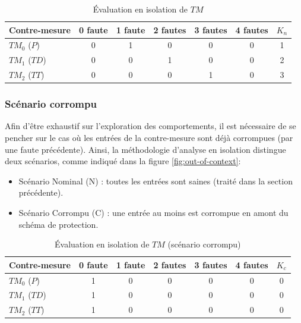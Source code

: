                 \begin{table}[ht]
                    {\small
                    \begin{center}
                        \begin{tabular}{l|cccccc}
                        Contre-mesure & 0 faute & 1 faute & 2 fautes & 3 fautes & 4 fautes & $K_n$ \\
                        \hline
                        $TM_0$ ($P$) & 0 & 1 & 0 & 0 & 0 & 1\\
                        $TM_1$ ($TD$) & 0 & 0 & 1 & 0 & 0 & 2 \\
                        $TM_2$ ($TT$) & 0 & 0 & 0 & 1 & 0 & 3
                        \end{tabular}
                    \end{center} 
                    }
                    \caption{Évaluation en isolation de $TM$ \label{tbl:tm-ooc-N}}
                \end{table}
            
            \subsubsection{Scénario corrompu}
            \label{sec:fscenario}
            
                Afin d'être exhaustif sur l'exploration des comportements, il est nécessaire de se pencher sur le cas où les entrées de la contre-mesure sont déjà corrompues (par une faute précédente).
                Ainsi, la méthodologie d'analyse en isolation distingue deux scénarios, comme indiqué dans la figure \ref{fig:out-of-context}:
                \begin{itemize}
                    \item Scénario Nominal (N) : toutes les entrées sont saines (traité dans la section précédente).
                    \item Scénario Corrompu (C) : une entrée au moins est corrompue en amont du schéma de protection.
                \end{itemize}
                
                \begin{table}[ht]
                    {\small
                    \begin{center}
                        \begin{tabular}{l|cccccc}
                        Contre-mesure & 0 faute & 1 faute & 2 fautes & 3 fautes & 4 fautes & $K_c$ \\
                        \hline
                        $TM_0$ ($P$) & 1 & 0 & 0 & 0 & 0 & 0\\
                        $TM_1$ ($TD$) & 1 & 0 & 0 & 0 & 0 & 0\\
                        $TM_2$ ($TT$) & 1 & 0 & 0 & 0 & 0 & 0
                        \end{tabular}
                    \end{center} 
                    }
                    \caption{Évaluation en isolation de $TM$ (scénario corrompu)\label{tbl:tm-ooc-F}}
                \end{table}
                      
